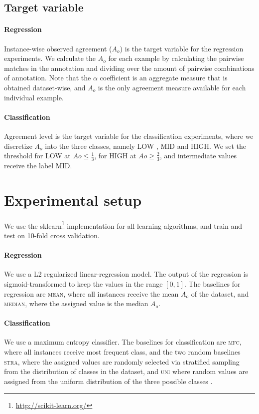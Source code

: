 \documentclass[11pt,a4paper]{article}
\begin{document}
\subsection{Target variable}
\paragraph*{Regression} Instance-wise observed agreement ($A_o$) is the target variable for the regression experiments. We calculate  the $A_o$ for each example by calculating the pairwise matches in the annotation and dividing over the amount of pairwise combinations of annotation. 
Note that the $\alpha$ coefficient is an aggregate measure that is obtained dataset-wise, and $A_o$ is the only agreement measure available for each individual example.
\paragraph*{Classification} Agreement level is the target variable for the classification experiments, where we discretize $A_o$ into the three classes, namely LOW , MID and HIGH. We set the threshold for LOW at $Ao \le \frac{1}{3}$, for HIGH at $Ao \ge \frac{2}{3}$, and intermediate values receive the label MID.


\section{Experimental setup}
We use the sklearn\footnote{\url{http://scikit-learn.org/}} implementation for all learning algorithms, and train and test on 10-fold cross validation.

\paragraph*{Regression} We use a L2 regularized linear-regression model. The output of the regression is sigmoid-transformed to keep the values in the range $[0,1]$. The baselines for regression are \textsc{mean}, where all instances receive the mean $A_o$ of the dataset, and  \textsc{median}, where the assigned value is the median $A_o$. 

\paragraph*{Classification} We use a maximum entropy classifier. The baselines for classification are \textsc{mfc}, where all instances receive most frequent class, and the two random baselines \textsc{stra}, where the assigned values are randomly selected via stratified sampling from the distribution of classes in the dataset, and \textsc{uni} where random values are assigned from the uniform distribution of the three possible classes . 
\end{document}
